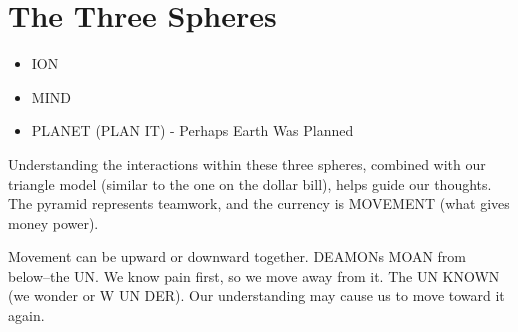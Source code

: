 ﻿\section{The Three Spheres}

\begin{itemize}
    \item ION
    \item MIND
    \item PLANET (PLAN IT) - Perhaps Earth Was Planned
\end{itemize}

Understanding the interactions within these three spheres, combined with our triangle model (similar to the one on the dollar bill), helps guide our thoughts. The pyramid represents teamwork, and the currency is MOVEMENT (what gives money power).

Movement can be upward or downward together. DEAMONs MOAN from below--the UN. We know pain first, so we move away from it. The UN KNOWN (we wonder or W UN DER). Our understanding may cause us to move toward it again.